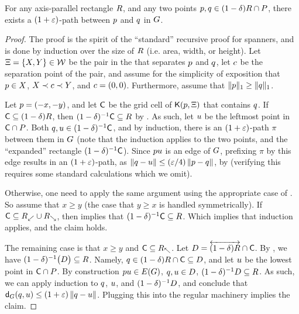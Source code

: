 \documentclass[12pt]{article}%
\begin{document}
\begin{lemma}
    For any axis-parallel rectangle $R$, and any two points
    $p, q \in (1-\delta)R \cap P$, there exists a
    $(1+\varepsilon)$-path between $p$ and $q$ in $G$.
\end{lemma}
\begin{proof}
    The proof is the spirit of the ``standard'' recursive proof for
    spanners, and is done by induction over the size of $R$
    (i.e. area, width, or height). Let
    $\Xi = \{ X, Y \} \in \mathcal{W}$ be the pair in the \QSPD that
    separates $p$ and $q$, let $c$ be the separation point of
    the pair, and assume for the simplicity of exposition that
    $p \in X$, $X \prec c \prec Y$, and $c =
    (0,0)$. Furthermore, assume that $\|p\|_1 \geq \|q\|_1$.

    Let $p = (-x,-y)$, and let $\mathsf{C}$ be the grid cell of
    $\mathsf{K}(p, \Xi)$ that contains $q$. If
    $\mathsf{C} \subseteq (1-\delta)R$, then
    $(1-\delta)^{-1}\mathsf{C} \subseteq R$ by 
    . As such, let $u$ be the leftmost point in
    $\mathsf{C} \cap P$. Both $q, u \in (1-\delta)^{-1}\mathsf{C}$, and by
    induction, there is an $(1+\varepsilon)$-path $\pi$ between them in $G$
    (note that the induction applies to the two points, and the
    ``expanded'' rectangle $(1-\delta)^{-1}\mathsf{C}$). Since $p u$ is
    an edge of $G$, prefixing $\pi$ by this edge results in an
    $(1+\varepsilon)$-path, as $\left\| q - u \right\| \leq (\varepsilon/4) \left\| p - q \right\|$,
    by   (verifying this requires
    some standard calculations which we omit).

    Otherwise, one need to apply the same argument using the
    appropriate case of .  So assume that $x \geq y$
    (the case that $y \geq x$ is handled symmetrically). If
    $\mathsf{C} \subseteq R_\swarrow \cup R_\searrow$, then
     implies that
    $(1-\delta)^{-1} \mathsf{C} \subseteq R$. Which implies that
    induction applies, and the claim holds.

    The remaining case is that $x \geq y$ and
    $\mathsf{C} \subseteq R_\nwarrow$.  Let
    $D= \overleftrightarrow{ (1-\delta)R} \cap \mathsf{C}$.  By ,
    we have $(1-\delta)^{-1} \bigl(D \bigr) \subseteq
    R$. Namely,
    $q \in (1-\delta)R \cap \mathsf{C} \subseteq D$, and let
    $u$ be the lowest point in $\mathsf{C} \cap P$. By construction
    $\pa \pc \in \EGX{\G}$, $q, u \in D$,
    $(1-\delta)^{-1} D \subseteq R$. As such, we can apply
    induction to $q$, $u$, and $(1-\delta)^{-1} D$, and
    conclude that $\dGZ{\G}{\pb}{\pc} \leq (1+\eps) \dY{\pb}{\pc}$.
    Plugging this into the regular machinery implies the claim.
\end{proof}
\end{document}
